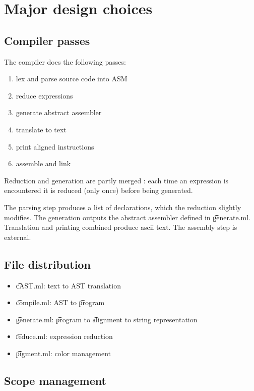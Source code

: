\section{Major design choices}

\subsection{Compiler passes}

The compiler does the following passes:
\begin{enumerate}
    \item lex and parse source code into ASM
    \item reduce expressions
    \item generate abstract assembler
    \item translate to text
    \item print aligned instructions
    \item assemble and link
\end{enumerate}

Reduction and generation are partly merged : each time an expression is encountered it is reduced (only once) before being generated.

The parsing step produces a list of declarations, which the reduction slightly modifies. The generation outputs the abstract assembler defined in \t{generate.ml}. Translation and printing combined produce ascii text. The assembly step is external.

\subsection{File distribution}

\begin{itemize}
    \item \t{cAST.ml}: text to AST translation
    \item \t{compile.ml}: AST to \t{program}
    \item \t{generate.ml}: \t{program} to \t{alignment} to string representation
    \item \t{reduce.ml}: expression reduction
    \item \t{pigment.ml}: color management
\end{itemize}

\subsection{Scope management}

